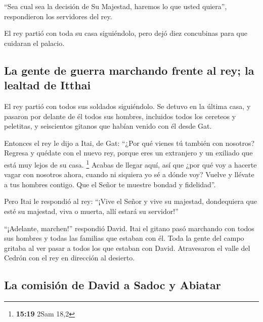  ``Sea cual sea la decisión de Su Majestad, haremos lo
que usted quiera'', respondieron los servidores del rey.

 El rey partió con toda su casa siguiéndolo, pero dejó
diez concubinas para que cuidaran el palacio.

\hypertarget{la-gente-de-guerra-marchando-frente-al-rey-la-lealtad-de-itthai}{%
\subsection{La gente de guerra marchando frente al rey; la lealtad de
Itthai}\label{la-gente-de-guerra-marchando-frente-al-rey-la-lealtad-de-itthai}}

 El rey partió con todos sus soldados siguiéndolo. Se
detuvo en la última casa,  y pasaron por delante de él
todos sus hombres, incluidos todos los cereteos y peletitas, y
seiscientos gitanos que habían venido con él desde Gat.

 Entonces el rey le dijo a Itai, de Gat: ``¿Por qué
vienes tú también con nosotros? Regresa y quédate con el nuevo rey,
porque eres un extranjero y un exiliado que está muy lejos de su casa.
\footnote{\textbf{15:19} 2Sam 18,2}  Acabas de llegar
aquí, así que ¿por qué voy a hacerte vagar con nosotros ahora, cuando ni
siquiera yo sé a dónde voy? Vuelve y llévate a tus hombres contigo. Que
el Señor te muestre bondad y fidelidad''.

 Pero Itai le respondió al rey: ``¡Vive el Señor y vive
su majestad, dondequiera que esté su majestad, viva o muerta, allí
estará su servidor!''

 ``¡Adelante, marchen!'' respondió David. Itai el gitano
pasó marchando con todos sus hombres y todas las familias que estaban
con él.  Toda la gente del campo gritaba al ver pasar a
todos los que estaban con David. Atravesaron el valle del Cedrón con el
rey en dirección al desierto.

\hypertarget{la-comisiuxf3n-de-david-a-sadoc-y-abiatar}{%
\subsection{La comisión de David a Sadoc y
Abiatar}\label{la-comisiuxf3n-de-david-a-sadoc-y-abiatar}}

